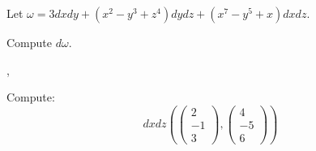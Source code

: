 \documentclass{ximera}
\author{Bart Snapp}
\begin{document}
\begin{exercise}
  Let $\omega =  3 dxdy + (x^2 -y^3 + z^4) dydz + (x^7-y^5+x) dx dz$.

  Compute $d \omega$.
\end{exercise}

\vfill

\sep

\begin{exercise}
  Compute:
  \[
  dxdz\left(
  \begin{pmatrix}
    2\\
    -1\\
    3
  \end{pmatrix},
  \begin{pmatrix}
    4\\
    -5\\
    6
  \end{pmatrix}\right)
  \]
\end{exercise}

\vfill
\end{document}
